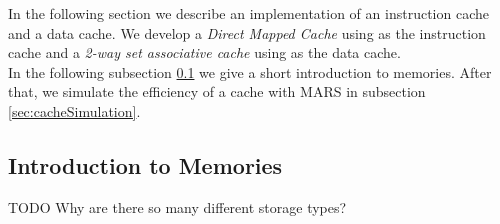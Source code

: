 In the following section we describe an implementation of an instruction cache and a data cache. We develop a \textit{Direct Mapped Cache} using as the instruction cache and a \textit{2-way set associative cache} using as the data cache.\\
In the following subsection \ref{sec:introductionToMemories} we give a short introduction to memories. After that, we simulate the efficiency of a cache with MARS in subsection \ref{sec:cacheSimulation}.


\subsection{Introduction to Memories}
\label{sec:introductionToMemories}
TODO
Why are there so many different storage types?


